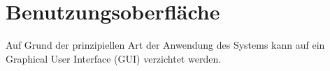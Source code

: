 \section{Benutzungsoberfläche}

Auf Grund der prinzipiellen Art der Anwendung des Systems kann auf ein Graphical User Interface (GUI) verzichtet werden.
